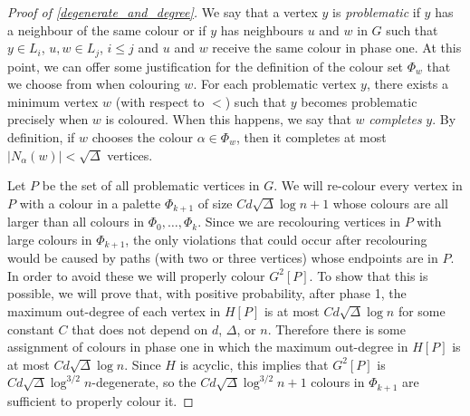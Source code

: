\documentclass{patmorin}
\newcommand{\defin}[1]{\emph{\color{brightmaroon}#1}}
\begin{document}
\begin{proof}[Proof of \cref{degenerate_and_degree}]

  We say that a vertex $y$ is \defin{problematic} if $y$ has a neighbour of the same colour or if $y$ has neighbours $u$ and $w$ in $G$ such that $y\in L_i$, $u,w\in L_j$, $i \le j$ and $u$ and $w$ receive the same colour in phase one.  At this point, we can offer some justification for the definition of the colour set $\Phi_w$ that we choose from when colouring $w$. For each problematic vertex $y$, there exists a minimum vertex $w$ (with respect to $<$) such that $y$ becomes problematic precisely when $w$ is coloured.  When this happens, we say that $w$ \defin{completes} $y$. By definition, if $w$ chooses the colour $\alpha\in\Phi_w$, then it completes at most $|N_{\alpha}(w)|<\sqrt{\Delta}$ vertices.



  Let $P$ be the set of all problematic vertices in $G$.  We will re-colour every vertex in $P$ with a colour in a palette $\Phi_{k+1}$ of size $Cd\sqrt{\Delta}\log n+1$ whose colours are all larger than all colours in $\Phi_0,\ldots,\Phi_k$.  Since we are recolouring vertices in $P$ with large colours in $\Phi_{k+1}$, the only violations that could occur after recolouring would be caused by paths (with two or three vertices) whose endpoints are in $P$.  In order to avoid these we will properly colour $G^2[P]$.  To show that this is possible, we will prove that, with positive probability, after phase 1, the maximum out-degree of each vertex in $H[P]$ is at most $Cd\sqrt{\Delta}\log n$ for some constant $C$ that does not depend on $d$, $\Delta$, or $n$.  Therefore there is some assignment of colours in phase one in which the maximum out-degree in $H[P]$ is at most $Cd\sqrt{\Delta}\log n$.  Since $H$ is acyclic, this implies that $G^2[P]$ is $Cd\sqrt{\Delta}\log^{3/2} n$-degenerate, so the $Cd\sqrt{\Delta}\log^{3/2} n+1$ colours in $\Phi_{k+1}$ are sufficient to properly colour it.


\end{proof}
\end{document}
